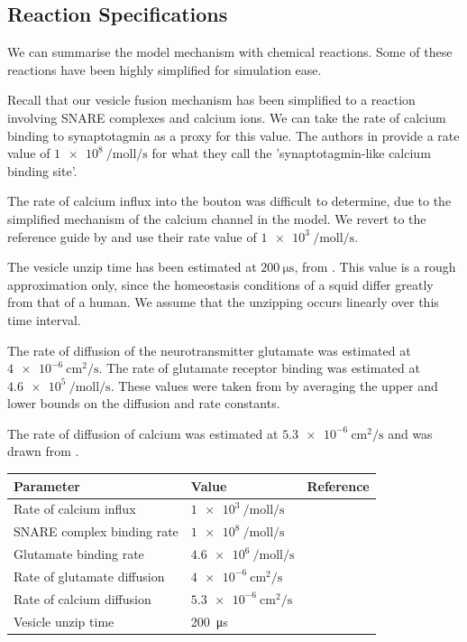 \documentclass[a4paper]{article}
\begin{document}
\subsection{Reaction Specifications}
We can summarise the model mechanism with chemical reactions. Some of these reactions have been highly simplified for simulation ease.

Recall that our vesicle fusion mechanism has been simplified to a reaction involving SNARE complexes and calcium ions. We can take the rate of calcium binding to synaptotagmin as a proxy for this value. The authors in \cite{ma2014quantitative} provide a rate value of $\SI{1e8}{\per\mol\litre\per\second}$ for what they call the 'synaptotagmin-like calcium binding site'. 

The rate of calcium influx into the bouton was difficult to determine, due to the simplified mechanism of the calcium channel in the model. We revert to the reference guide by \cite{Czech:MethodsMolBiol:2009} and use their rate value of $\SI{1e3}{\per\mole\litre\per\second}$.

The vesicle unzip time has been estimated at $\SI{200}{\micro\second}$, from \cite{Llinas:TheSquidGiantSynapseAModel:1999}. This value is a rough approximation only, since the homeostasis conditions of a squid differ greatly from that of a human. We assume that the unzipping occurs linearly over this time interval.

The rate of diffusion of the neurotransmitter glutamate was estimated at $\SI{4e-6}{\centi\metre\squared\per\second}$. The rate of glutamate receptor binding was estimated at $\SI{4.6e5}{\per\mol\litre\per\second}$. These values were taken from \cite{rusakov2001role} by averaging the upper and lower bounds on the diffusion and rate constants.

The rate of diffusion of calcium was estimated at $\SI{5.3e-6}{\centi\metre\squared\per\second}$ and was drawn from \cite{Dittrich:BiophysJ:2013}.
\begin{table}[H]
\begin{tabular}{lll}
Parameter & Value & Reference \\ \hline
Rate of calcium influx   &  $\SI{1e3}{\per\mole\litre\per\second}$      &    \cite{Czech:MethodsMolBiol:2009} \\
SNARE complex binding rate & $\SI{1e8}{\per\mol\litre\per\second}$ & \cite{ma2014quantitative}\\
Glutamate binding rate & $\SI{4.6e6}{\per\mol\litre\per\second}$ & \cite{rusakov2001role} \\
Rate of glutamate diffusion & $\SI{4e-6}{\centi\metre\squared\per\second} $      &\cite{rusakov2001role} \\
Rate of calcium diffusion & $\SI{5.3e-6}{\centi\metre\squared\per\second} $      &\cite{Dittrich:BiophysJ:2013} \\
Vesicle unzip time & \SI{200}{\micro\second} & \cite{Llinas:TheSquidGiantSynapseAModel:1999}\\
\end{tabular}
\end{table}
\end{document}

